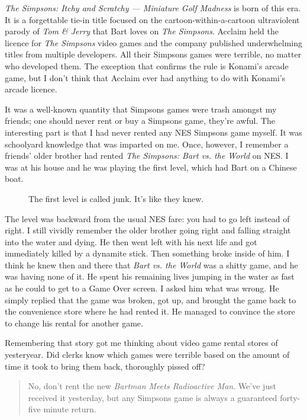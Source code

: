 \documentclass{book}
\begin{document}
\emph{The Simpsons: Itchy and Scratchy — Miniature Golf Madness} is born of this era. It is a forgettable tie-in title focused on the cartoon-within-a-cartoon ultraviolent parody of \emph{Tom \& Jerry} that Bart loves on \emph{The Simpsons}. Acclaim held the licence for \emph{The Simpsons} video games and the company published underwhelming titles from multiple developers. All their Simpsons games were terrible, no matter who developed them. The exception that confirms the rule is Konami’s arcade game, but I don’t think that Acclaim ever had anything to do with Konami’s arcade licence.\par
It was a well-known quantity that Simpsons games were trash amongst my friends; one should never rent or buy a Simpsons game, they’re awful. The interesting part is that I had never rented any NES Simpsons game myself. It was schoolyard knowledge that was imparted on me. Once, however, I remember a friends’ older brother had rented \emph{The Simpsons: Bart vs. the World} on NES. I was at his house and he was playing the first level, which had Bart on a Chinese boat.\par
\FloatBarrier\vspace{\baselineskip}\begin{figure}[H]\caption*{The first level is called junk. It’s like they knew.}\end{figure}
The level was backward from the usual NES fare: you had to go left instead of right. I still vividly remember the older brother going right and falling straight into the water and dying. He then went left with his next life and got immediately killed by a dynamite stick. Then something broke inside of him. I think he knew then and there that \emph{Bart vs. the World} was a shitty game, and he was having none of it. He spent his remaining lives jumping in the water as fast as he could to get to a Game Over screen. I asked him what was wrong. He simply replied that the game was broken, got up, and brought the game back to the convenience store where he had rented it. He managed to convince the store to change his rental for another game.\par
Remembering that story got me thinking about video game rental stores of yesteryear. Did clerks know which games were terrible based on the amount of time it took to bring them back, thoroughly pissed off?\par
\begin{quote}
No, don’t rent the new \emph{Bartman Meets Radioactive Man}. We’ve just received it yesterday, but any Simpsons game is always a guaranteed forty-five minute return.\par
\end{quote} \par
\end{document}
